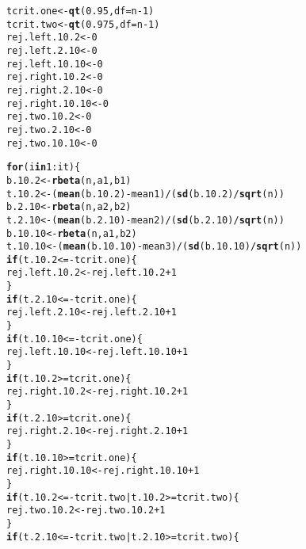 \documentclass{article}\usepackage[]{graphicx}\usepackage[]{xcolor}
\makeatletter
\newcommand{\hlnum}[1]{\textcolor[rgb]{0.686,0.059,0.569}{#1}}%
\newcommand{\hlopt}[1]{\textcolor[rgb]{0,0,0}{#1}}%
\newcommand{\hldef}[1]{\textcolor[rgb]{0.345,0.345,0.345}{#1}}%
\newcommand{\hlkwa}[1]{\textcolor[rgb]{0.161,0.373,0.58}{\textbf{#1}}}%
\newcommand{\hlkwb}[1]{\textcolor[rgb]{0.69,0.353,0.396}{#1}}%
\newcommand{\hlkwc}[1]{\textcolor[rgb]{0.333,0.667,0.333}{#1}}%
\newcommand{\hlkwd}[1]{\textcolor[rgb]{0.737,0.353,0.396}{\textbf{#1}}}%
\newenvironment{kframe}{%
 \def\at@end@of@kframe{}%
 \ifinner\ifhmode%
  \def\at@end@of@kframe{\end{minipage}}%
  \begin{minipage}{\columnwidth}%
 \fi\fi%
 \def\FrameCommand##1{\hskip\@totalleftmargin \hskip-\fboxsep
 \colorbox{shadecolor}{##1}\hskip-\fboxsep
     \hskip-\linewidth \hskip-\@totalleftmargin \hskip\columnwidth}%
 \MakeFramed {\advance\hsize-\width
   \@totalleftmargin\z@ \linewidth\hsize
   \@setminipage}}%
 {\par\unskip\endMakeFramed%
 \at@end@of@kframe}
\newenvironment{knitrout}{}{} %
\makeatother
\begin{document}
\begin{enumerate}
\begin{enumerate}
\begin{knitrout}
\begin{kframe}
\begin{alltt}
\hldef{tcrit.one} \hlkwb{<-} \hlkwd{qt}\hldef{(}\hlnum{0.95}\hldef{,} \hlkwc{df} \hldef{= n}\hlopt{-}\hlnum{1}\hldef{)}
\hldef{tcrit.two} \hlkwb{<-} \hlkwd{qt}\hldef{(}\hlnum{0.975}\hldef{,} \hlkwc{df} \hldef{= n}\hlopt{-}\hlnum{1}\hldef{)}
\hldef{rej.left.10.2} \hlkwb{<-} \hlnum{0}
\hldef{rej.left.2.10} \hlkwb{<-} \hlnum{0}
\hldef{rej.left.10.10} \hlkwb{<-} \hlnum{0}
\hldef{rej.right.10.2} \hlkwb{<-} \hlnum{0}
\hldef{rej.right.2.10} \hlkwb{<-} \hlnum{0}
\hldef{rej.right.10.10} \hlkwb{<-} \hlnum{0}
\hldef{rej.two.10.2} \hlkwb{<-} \hlnum{0}
\hldef{rej.two.2.10} \hlkwb{<-} \hlnum{0}
\hldef{rej.two.10.10} \hlkwb{<-} \hlnum{0}

\hlkwa{for}\hldef{(i} \hlkwa{in} \hlnum{1}\hlopt{:}\hldef{it)\{}
  \hldef{b.10.2} \hlkwb{<-} \hlkwd{rbeta}\hldef{(n,a1,b1)}
  \hldef{t.10.2} \hlkwb{<-} \hldef{(}\hlkwd{mean}\hldef{(b.10.2)}\hlopt{-}\hldef{mean1)} \hlopt{/} \hldef{(}\hlkwd{sd}\hldef{(b.10.2)}\hlopt{/}\hlkwd{sqrt}\hldef{(n))}
  \hldef{b.2.10} \hlkwb{<-} \hlkwd{rbeta}\hldef{(n,a2,b2)}
  \hldef{t.2.10} \hlkwb{<-} \hldef{(}\hlkwd{mean}\hldef{(b.2.10)}\hlopt{-}\hldef{mean2)} \hlopt{/} \hldef{(}\hlkwd{sd}\hldef{(b.2.10)}\hlopt{/}\hlkwd{sqrt}\hldef{(n))}
  \hldef{b.10.10} \hlkwb{<-} \hlkwd{rbeta}\hldef{(n,a1,b2)}
  \hldef{t.10.10} \hlkwb{<-} \hldef{(}\hlkwd{mean}\hldef{(b.10.10)}\hlopt{-}\hldef{mean3)} \hlopt{/} \hldef{(}\hlkwd{sd}\hldef{(b.10.10)}\hlopt{/}\hlkwd{sqrt}\hldef{(n))}
  \hlkwa{if}\hldef{(t.10.2} \hlopt{<= -}\hldef{tcrit.one)\{}
    \hldef{rej.left.10.2} \hlkwb{<-} \hldef{rej.left.10.2} \hlopt{+} \hlnum{1}
  \hldef{\}}
  \hlkwa{if}\hldef{(t.2.10} \hlopt{<= -}\hldef{tcrit.one)\{}
    \hldef{rej.left.2.10} \hlkwb{<-} \hldef{rej.left.2.10} \hlopt{+} \hlnum{1}
  \hldef{\}}
  \hlkwa{if}\hldef{(t.10.10} \hlopt{<= -}\hldef{tcrit.one)\{}
    \hldef{rej.left.10.10} \hlkwb{<-} \hldef{rej.left.10.10} \hlopt{+} \hlnum{1}
  \hldef{\}}
  \hlkwa{if}\hldef{(t.10.2} \hlopt{>=} \hldef{tcrit.one)\{}
    \hldef{rej.right.10.2} \hlkwb{<-} \hldef{rej.right.10.2} \hlopt{+} \hlnum{1}
  \hldef{\}}
  \hlkwa{if}\hldef{(t.2.10} \hlopt{>=} \hldef{tcrit.one)\{}
    \hldef{rej.right.2.10} \hlkwb{<-} \hldef{rej.right.2.10} \hlopt{+} \hlnum{1}
  \hldef{\}}
  \hlkwa{if}\hldef{(t.10.10} \hlopt{>=} \hldef{tcrit.one)\{}
    \hldef{rej.right.10.10} \hlkwb{<-} \hldef{rej.right.10.10} \hlopt{+} \hlnum{1}
  \hldef{\}}
  \hlkwa{if}\hldef{(t.10.2} \hlopt{<= -}\hldef{tcrit.two} \hlopt{|} \hldef{t.10.2} \hlopt{>=} \hldef{tcrit.two)\{}
    \hldef{rej.two.10.2} \hlkwb{<-} \hldef{rej.two.10.2} \hlopt{+} \hlnum{1}
  \hldef{\}}
  \hlkwa{if}\hldef{(t.2.10} \hlopt{<= -}\hldef{tcrit.two} \hlopt{|} \hldef{t.2.10} \hlopt{>=} \hldef{tcrit.two)\{}

\end{alltt}
\end{kframe}
\end{knitrout}
\end{enumerate}
\end{enumerate}
\end{document}
